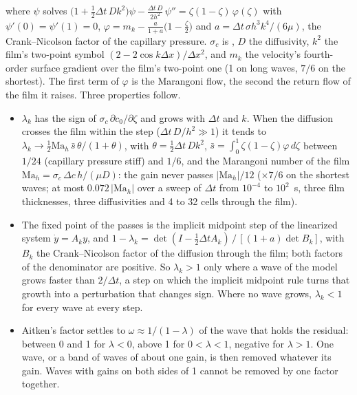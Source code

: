 where $\psi$ solves
$\bigl(1 + \tfrac12\Delta t\,D k^2\bigr)\psi - \tfrac{\Delta t\,D}{2h^2}\,\psi''
 = \zeta(1-\zeta)\,\varphi(\zeta)$ with $\psi'(0) = \psi'(1) = 0$,
$\varphi = m_k - \frac{a}{1+a}\bigl(1 - \frac{\zeta}{2}\bigr)$ and
$a = \Delta t\,\sigma h^3 k^4/(6\mu)$, the Crank--Nicolson factor of the
capillary pressure. $\sigma_c$ is , $D$ the
diffusivity, $k^2$ the film's two-point symbol
$(2 - 2\cos k\Delta x)/\Delta x^2$, and $m_k$ the velocity's fourth-order
surface gradient over the film's two-point one (1 on long waves, $7/6$ on
the shortest). The first term of $\varphi$ is the Marangoni flow, the
second the return flow of the film it raises. Three properties follow.

\begin{itemize}
  \item $\lambda_k$ has the sign of $\sigma_c\,\partial c_0/\partial\zeta$
    and grows with $\Delta t$ and $k$. When the diffusion crosses the film
    within the step ($\Delta t\,D/h^2 \gg 1$) it tends to
    $\lambda_k \to \tfrac12 \mathrm{Ma}_h\,\bar s\,\theta/(1+\theta)$, with
    $\theta = \tfrac12\Delta t\,D k^2$, $\bar s = \int_0^1\zeta(1-\zeta)\varphi\,d\zeta$
    between $1/24$ (capillary pressure stiff) and $1/6$, and the Marangoni
    number of the film $\mathrm{Ma}_h = \sigma_c\,\Delta c\,h/(\mu D)$: the
    gain never passes $|\mathrm{Ma}_h|/12$ ($\times 7/6$ on the shortest
    waves; at most $0.072\,|\mathrm{Ma}_h|$ over a sweep of $\Delta t$ from
    $10^{-4}$ to $10^{2}$~\si{\second}, three film thicknesses, three diffusivities
    and 4 to 32 cells through the film).
  \item The fixed point of the passes is the implicit midpoint step of the
    linearized system $\dot y = A_k y$, and
    $1 - \lambda_k = \det(I - \tfrac12\Delta t A_k)\,/\,[(1+a)\det B_k]$, with
    $B_k$ the Crank--Nicolson factor of the diffusion through the film; both
    factors of the denominator are positive. So $\lambda_k > 1$ only where
    a wave of the model grows faster than $2/\Delta t$, a step on which the
    implicit midpoint rule turns that growth into a perturbation that
    changes sign. Where no wave grows, $\lambda_k < 1$ for every wave at
    every step.
  \item Aitken's factor settles to $\omega \approx 1/(1-\lambda)$ of the wave
    that holds the residual: between 0 and 1 for $\lambda < 0$, above 1
    for $0 < \lambda < 1$, negative for $\lambda > 1$. One wave, or a band
    of waves of about one gain, is then removed whatever its gain. Waves
    with gains on both sides of 1 cannot be removed by one factor together.
\end{itemize}

